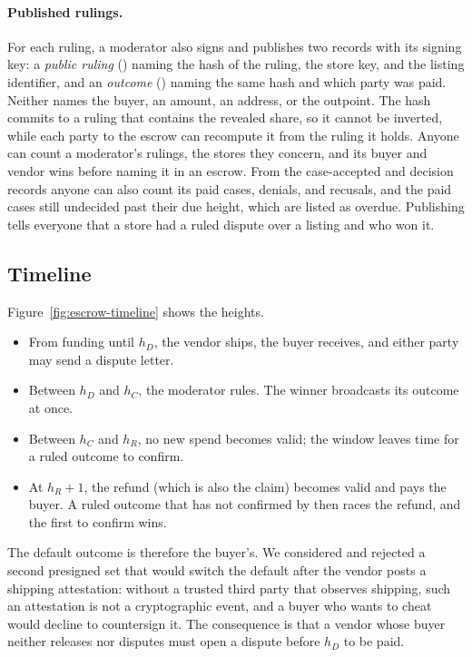 \paragraph{Published rulings.} For each ruling, a moderator also signs and publishes two records with its signing key: a \emph{public ruling} () naming the hash of the ruling, the store key, and the listing identifier, and an \emph{outcome} () naming the same hash and which party was paid. Neither names the buyer, an amount, an address, or the outpoint. The hash commits to a ruling that contains the revealed share, so it cannot be inverted, while each party to the escrow can recompute it from the ruling it holds. Anyone can count a moderator's rulings, the stores they concern, and its buyer and vendor wins before naming it in an escrow. From the case-accepted and decision records anyone can also count its paid cases, denials, and recusals, and the paid cases still undecided past their due height, which are listed as overdue. Publishing tells everyone that a store had a ruled dispute over a listing and who won it.

\subsection{Timeline}

Figure~\ref{fig:escrow-timeline} shows the heights.
\begin{itemize}
  \item From funding until $h_D$, the vendor ships, the buyer receives, and either party may send a dispute letter.
  \item Between $h_D$ and $h_C$, the moderator rules. The winner broadcasts its outcome at once.
  \item Between $h_C$ and $h_R$, no new spend becomes valid; the window leaves time for a ruled outcome to confirm.
  \item At $h_R+1$, the refund (which is also the claim) becomes valid and pays the buyer. A ruled outcome that has not confirmed by then races the refund, and the first to confirm wins.
\end{itemize}

The default outcome is therefore the buyer's. We considered and rejected a second presigned set that would switch the default after the vendor posts a shipping attestation: without a trusted third party that observes shipping, such an attestation is not a cryptographic event, and a buyer who wants to cheat would decline to countersign it. The consequence is that a vendor whose buyer neither releases nor disputes must open a dispute before $h_D$ to be paid.

